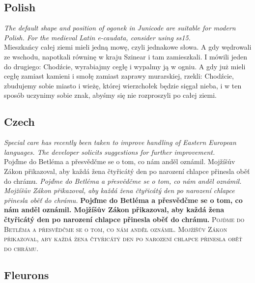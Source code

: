 \documentclass[12pt,a4paper,openany]{book}
\begin{document}
\subsection*{Polish}
{\small\itshape The default shape and position of ogonek in Junicode are suitable
for modern Polish. For the medieval Latin e-caudata, consider using
ss15.}\\[1ex]
Mieszkańcy całej ziemi mieli jedną mowę, czyli jednakowe słowa.  A
gdy wędrowali ze wschodu, napotkali równinę w kraju Szinear i tam
zamieszkali.  I mówili jeden do drugiego: Chodźcie, wyrabiajmy cegłę
i wypalmy ją w ogniu. A gdy już mieli cegłę zamiast kamieni i smołę
zamiast zaprawy murarskiej, rzekli: Chodźcie, zbudujemy sobie miasto
i wieżę, której wierzchołek będzie sięgał nieba, i w ten sposób
uczynimy sobie znak, abyśmy się nie rozproszyli po całej ziemi.

\subsection*{Czech}
{\small\itshape Special care has recently been taken to improve
  handling
of Eastern European languages. The developer solicits suggestions for
further improvement.}\\
Pojďme do Betléma a přesvědčme
se o tom, co nám anděl oznámil. Mojžíšův Zákon přikazoval, aby každá
žena čtyřicátý den po narození chlapce přinesla oběť do chrámu.
{\itshape Pojďme do Betléma a přesvědčme
se o tom, co nám anděl oznámil. Mojžíšův Zákon přikazoval, aby každá
žena čtyřicátý den po narození chlapce přinesla oběť do chrámu.}
{\bfseries Pojďme do Betléma a přesvědčme
se o tom, co nám anděl oznámil. Mojžíšův Zákon přikazoval, aby každá
žena čtyřicátý den po narození chlapce přinesla oběť do chrámu.}
{\scshape Pojďme do Betléma a přesvědčme
se o tom, co nám anděl oznámil. Mojžíšův Zákon přikazoval, aby každá
žena čtyřicátý den po narození chlapce přinesla oběť do chrámu.}

\subsection*{Fleurons}

\begin{center}
\huge    \\
 \\[0.7ex]
\\[0.7ex]
\\
 
\end{center}
\end{document}

